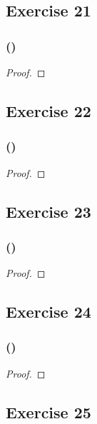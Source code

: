 \documentclass[14pt]{extarticle}
\begin{document}
\subsection{Exercise 21}

\subsubsection{()}

\begin{proof}

\end{proof}

\subsection{Exercise 22}

\subsubsection{()}

\begin{proof}

\end{proof}

\subsection{Exercise 23}

\subsubsection{()}

\begin{proof}

\end{proof}

\subsection{Exercise 24}

\subsubsection{()}

\begin{proof}

\end{proof}

\subsection{Exercise 25}
\end{document}
